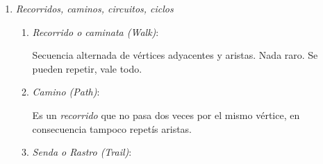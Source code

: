 \begin{enumerate}[label=\tiny\purple{\faIcon{calculator}}]
        Dado $G = (V, E)$, el \textit{grafo complementario} $\bar{G} = (V, \bar{E})$, donde el conjunto $V$
        es igual en $G$ y $\bar{G}$ mientras que $E \inter \bar{E} = \vacio$.
        $$
          \begin{tikzpicture} [ grafo style ]
            \node[nodo] (v1) {$v_1$};
            \node[nodo, right of=v1] (v2) {$v_2$};
            \node[nodo, below of=v2] (v3) {$v_3$};
            \node[nodo, left of=v3] (v4) {$v_4$};
            \draw[] (v1) to (v2);
            \draw[] (v3) to (v4);
            \draw[] (v1) to (v4);
            \draw[] (v2) to (v4);
            \node[left = 0.5cm of v1] (G) {$G$};
          \end{tikzpicture}
          \qquad
          \qquad
          \begin{tikzpicture} [ grafo style ]
            \node[nodo] (v1) {$v_1$};
            \node[nodo, right of=v1] (v2) {$v_2$};
            \node[nodo, below of=v2] (v3) {$v_3$};
            \node[nodo, left of=v3] (v4) {$v_4$};
            \draw[] (v1) to (v3);
            \draw[] (v3) to (v2);
            \node[right = 0.5cm of v2] (Gcomp) {$\bar{G}$};
          \end{tikzpicture}
        $$
        Dado que $G \union \bar{G}$ hacen un \textit{grafo completo}:
        $$
          \cajaResultado{
            \text{
              Si $G$ tiene $n$ \textit{vértices} y $\red{m}$ \textit{aristas}
              $\bar{G}$ tendrá, $\frac{n \cdot (n - 1)}{2} - \red{m}$ \textit{aristas}.
            }
          }
        $$

  \item \hypertarget{teoria-3:recorridos}{\textit{Recorridos, caminos, circuitos, ciclos}}
        \begin{enumerate}[label=\faIcon{snowman}$_{\arabic*)}$]
          \item \textit{Recorrido o caminata (Walk)}:

                Secuencia alternada de vértices adyacentes y aristas. Nada raro. Se pueden repetir, vale todo.

          \item \textit{Camino (Path)}:

                Es un \textit{recorrido} que no pasa dos veces por el mismo vértice, en consecuencia
                tampoco repetís aristas.

          \item \textit{Senda o Rastro (Trail)}:


\end{enumerate}
\end{enumerate}
